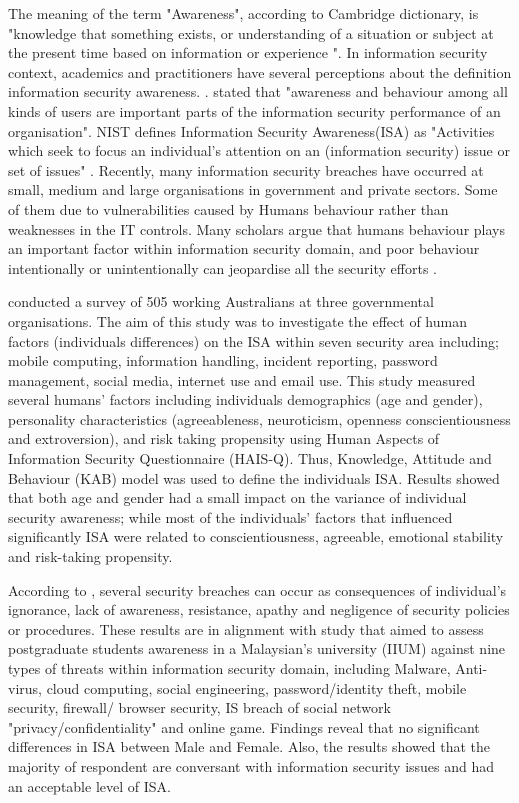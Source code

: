 The meaning of the term "Awareness", according to Cambridge dictionary, is "knowledge that something exists, or understanding of a situation or subject at the present time based on information or experience ".
In information security context, academics and practitioners have several perceptions about the definition information security awareness. \citet{Albrechtsen}. stated that "awareness and behaviour among all kinds of users are important parts of the information security performance of an organisation".  
NIST\cite{Kissel2013} defines Information Security Awareness(ISA) as "Activities which seek to focus an individual’s attention on an (information security) issue or set of issues" .  
Recently, many information security breaches have occurred at small, medium and large organisations in government and private sectors. Some of them due to vulnerabilities caused by Humans behaviour rather than  weaknesses in the IT controls. Many scholars argue that humans behaviour plays an important factor within information security domain, and poor behaviour intentionally or unintentionally can jeopardise all the security efforts \cite{Kruger2006,Butavicius2017,Bawazir2016,Giraldo2014,Lebek2013,McCormac2016,safa2015information,Benbasat2010a}.  

\citet{McCormac2016} conducted a survey of 505 working Australians at three governmental organisations. The aim of this study was to investigate the effect of human factors (individuals differences) on the ISA within seven security area including; mobile computing, information handling, incident reporting, password management, social media, internet use and email use. This study measured several humans' factors including individuals demographics (age and gender), personality characteristics (agreeableness, neuroticism, openness conscientiousness and extroversion), and risk taking propensity using Human Aspects of Information Security Questionnaire (HAIS-Q). Thus, Knowledge, Attitude and Behaviour (KAB) model was used to define the individuals ISA. Results showed that both age and gender had a small impact on the variance of individual security awareness; while most of the individuals' factors that  influenced significantly ISA were related to conscientiousness, agreeable, emotional stability and risk-taking propensity.

According to \citet{safa2015information}, several security breaches can occur as consequences of individual's ignorance, lack of awareness, resistance, apathy and negligence of security policies or procedures. 
These results are in alignment with  \citet{Hamid2014} study that aimed to assess postgraduate students awareness in a Malaysian's university (IIUM) against nine types of threats within information security domain, including Malware, Anti-virus, cloud computing, social engineering, password/identity theft, mobile security, firewall/ browser security, IS breach of social network "privacy/confidentiality" and online game. Findings reveal that no significant differences in ISA between Male and Female. Also, the results showed that the majority of respondent are conversant with information security issues and had an acceptable level of ISA. 

